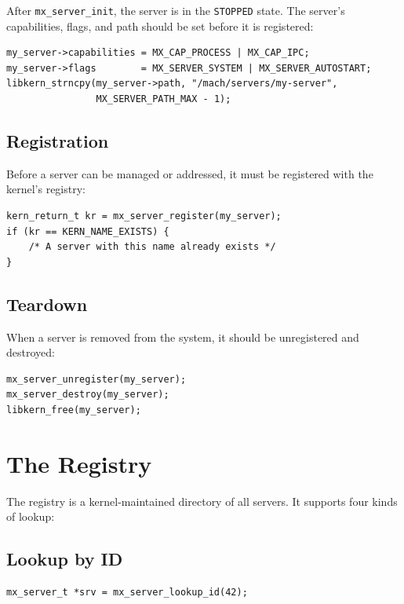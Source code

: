 \documentclass[a4paper,11pt]{article}
\begin{document}
After \texttt{mx\_server\_init}, the server is in the
\texttt{STOPPED} state. The server's capabilities, flags, and path
should be set before it is registered:

\begin{lstlisting}
my_server->capabilities = MX_CAP_PROCESS | MX_CAP_IPC;
my_server->flags        = MX_SERVER_SYSTEM | MX_SERVER_AUTOSTART;
libkern_strncpy(my_server->path, "/mach/servers/my-server",
                MX_SERVER_PATH_MAX - 1);
\end{lstlisting}

\subsection{Registration}

Before a server can be managed or addressed, it must be registered
with the kernel's registry:

\begin{lstlisting}
kern_return_t kr = mx_server_register(my_server);
if (kr == KERN_NAME_EXISTS) {
    /* A server with this name already exists */
}
\end{lstlisting}

\subsection{Teardown}

When a server is removed from the system, it should be unregistered
and destroyed:

\begin{lstlisting}
mx_server_unregister(my_server);
mx_server_destroy(my_server);
libkern_free(my_server);
\end{lstlisting}

\section{The Registry}

The registry is a kernel-maintained directory of all servers. It
supports four kinds of lookup:

\subsection{Lookup by ID}

\begin{lstlisting}
mx_server_t *srv = mx_server_lookup_id(42);
\end{lstlisting}
\end{document}
